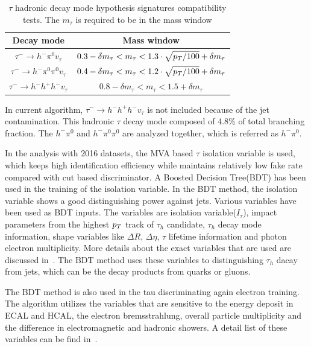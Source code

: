\begin{table}[htp]
\caption{$\tau$ hadronic decay mode hypothesis signatures compatibility tests. The $m_{\tau}$ is required to be in the mass window }\label{tb:tauHdecayRecomass}
\begin{center}
\begin{tabular}{|c|c|}
\hline
Decay mode                                             & Mass window\\\hline
$\tau^{-}\to h^{-}\pi^{0} v_{\tau}$                       & $0.3-\delta m_{\tau}<m_{\tau}<1.3\cdot \sqrt{p_{T}/100}+\delta m_{\tau}$      \\\hline
$\tau^{-}\to h^{-}\pi^{0} \pi^{0}  v_{\tau}$       &  $0.4-\delta m_{\tau}<m_{\tau}<1.2\cdot \sqrt{p_{T}/100}+\delta m_{\tau}$   \\\hline
$\tau^{-}\to h^{-}h^{+}h^{-}v_{\tau}$                     & $0.8-\delta m_{\tau}<m_{\tau}<1.5+\delta m_{\tau}$   \\\hline
 \end{tabular}
\end{center}
\end{table}

In current algorithm, $\tau^{-}\to h^{-}h^{+}h^{-}v_{\tau}$ is not included because of the jet contamination. This hadronic $\tau$ decay mode composed of 4.8\% of total branching fraction. The $h^{-}\pi^{0}$ and $h^{-}\pi^{0}\pi^{0}$ are analyzed together, which is referred as $h^{-}\pi^{0}$.

In the analysis with 2016 datasets, the MVA based $\tau$ isolation variable is used, which keeps high identification efficiency while maintains relatively low fake rate compared with cut based discriminator. A Boosted Decision Tree(BDT) has been used in the training of the isolation variable. In the BDT method, the isolation variable shows a good distinguishing power against jets. Various variables have been used as BDT inputs. The variables are isolation variable($I_{\tau}$), impact parameters from the highest $p_{T}$ track of $\tau_{h}$ candidate, $\tau_{h}$ decay mode information, shape variables like $\Delta R$, $\Delta \eta$, $\tau$ lifetime information and photon electron multiplicity. More details about the exact variables that are used are discussed in~\cite{TauRecoandIDRunII,TauReconstuction}. The BDT method uses these variables to distinguishing $\tau_{h}$ dacay from jets, which can be the decay products from quarks or gluons.  

The BDT method is also used in the tau discriminating again electron training. The algorithm utilizes the variables that are sensitive to the energy deposit in ECAL and HCAL, the electron bremsstrahlung, overall particle multiplicity and the difference in electromagnetic and hadronic showers. A detail list of these variables can be find in~\cite{TauRecoandIDRunII,TauReconstuction}.

